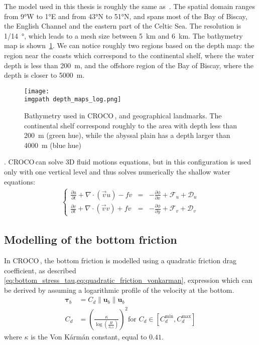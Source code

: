\documentclass[../../Main_ManuscritThese.tex]{subfiles}
\newcommand{\CROCO}{CROCO\,}
\newcommand\imgpath{/home/victor/acadwriting/Manuscrit/Text/Chapter5/img/}
\begin{document}
The model used in this thesis is roughly the same
as~\cite{boutet_estimation_2015}. The spatial domain ranges from
\ang{9}W to \ang{1}E and from \ang{43}N to \ang{51}N, and spans most
of the Bay of Biscay, the English Channel and the eastern part of the
Celtic Sea.  The resolution is \SI{1/14}{\degree}, which leads to a
mesh size between \SI{5}{\kilo\metre} and \SI{6}{\kilo\metre}. The bathymetry map is
shown~\cref{fig:depth_maps}. We can notice roughly two regions based
on the depth map: the region near the coasts which correspond to the
continental shelf, where the water depth is less than
\SI{200}{\meter}, and the offshore region of the Bay of Biscay, where
the depth is closer to \SI{5000}{\meter}.
\begin{figure}[ht]
  \centering
  \texttt{[image: \\imgpath depth\_maps\_log.png]}
  \caption{\label{fig:depth_maps} Bathymetry used in \CROCO, and geographical landmarks. The continental shelf correspond roughly to the area with depth less than \SI{200}{\meter} (green hue), while the abyssal plain has a depth larger than \SI{4000}{\meter} (blue hue)}
\end{figure}.
\CROCO can solve 3D fluid motions equations, but in this configuration
is used only with one vertical level and thus solves numerically the
shallow water equations:
\begin{align}
  \left\{
  \begin{array}{rcl}
    \frac{\partial u}{\partial t} + \nabla \cdot \left(\vec{v}u\right) - fv &=& -\frac{\partial \phi}{\partial x} + \mathcal{F}_{u} + \mathcal{D}_u \\
    \frac{\partial v}{\partial t} + \nabla \cdot \left(\vec{v}v\right) + fv &=& -\frac{\partial \phi}{\partial y} + \mathcal{F}_{v} + \mathcal{D}_v
  \end{array}
       \right.
\end{align}
\subsection{Modelling of the bottom friction}
In \CROCO, the bottom friction is modelled using a quadratic friction
drag coefficient, as described
\cref{eq:bottom_stress_tau,eq:quadratic_friction_vonkarman},
expression which can be derived by assuming a logarithmic profile of the velocity
at the bottom.
\begin{align}
  \label{eq:bottom_stress_tau}
  \bm{\tau}_b &= C_d \|\mathbf{u}_b\|\mathbf{u}_b \\  
  C_d &= \left(\frac{\kappa}{\log\left(\frac{H}{z_{0,b}}\right)}\right)^2 \text{for } C_d \in [C_d^{\min}, C_d^{\max}]   \label{eq:quadratic_friction_vonkarman}
\end{align}
where $\kappa$ is the Von K\'arm\'an constant, equal to $0.41$.
\end{document}
